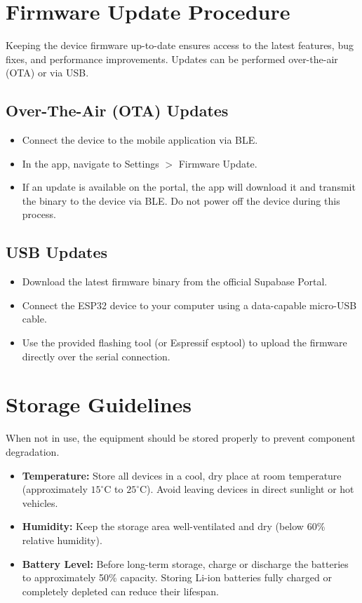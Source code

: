 \section{Firmware Update Procedure}
\label{sec:firmware-update}

Keeping the device firmware up-to-date ensures access to the latest features, bug fixes, and performance improvements. Updates can be performed over-the-air (OTA) or via USB.

\subsection{Over-The-Air (OTA) Updates}
\begin{itemize}
    \item Connect the device to the mobile application via BLE.
    \item In the app, navigate to Settings $>$ Firmware Update.
    \item If an update is available on the portal, the app will download it and transmit the binary to the device via BLE. Do not power off the device during this process.
\end{itemize}

\subsection{USB Updates}
\begin{itemize}
    \item Download the latest firmware binary from the official Supabase Portal.
    \item Connect the ESP32 device to your computer using a data-capable micro-USB cable.
    \item Use the provided flashing tool (or Espressif esptool) to upload the firmware directly over the serial connection.
\end{itemize}

\section{Storage Guidelines}
\label{sec:storage-guidelines}

When not in use, the equipment should be stored properly to prevent component degradation.
\begin{itemize}
    \item \textbf{Temperature:} Store all devices in a cool, dry place at room temperature (approximately $15^\circ$C to $25^\circ$C). Avoid leaving devices in direct sunlight or hot vehicles.
    \item \textbf{Humidity:} Keep the storage area well-ventilated and dry (below 60\% relative humidity).
    \item \textbf{Battery Level:} Before long-term storage, charge or discharge the batteries to approximately 50\% capacity. Storing Li-ion batteries fully charged or completely depleted can reduce their lifespan.
\end{itemize}

